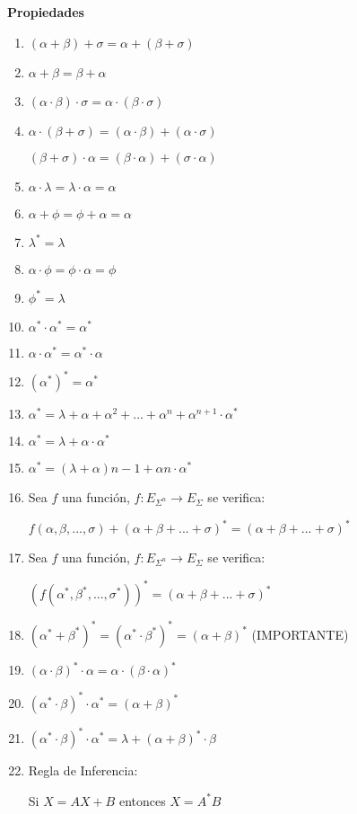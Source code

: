 \documentclass[12pt, twoside, openright]{report} %
\begin{document}
\textbf{Propiedades}
\begin{multicols}{2}
	\begin{enumerate}
		\item $(\alpha+\beta)+\sigma = \alpha + (\beta + \sigma)$
		\item $\alpha + \beta = \beta + \alpha$
		\item $(\alpha \cdot \beta)\cdot\sigma = \alpha \cdot (\beta\cdot\sigma)$
		\item $\alpha \cdot (\beta +\sigma) = (\alpha \cdot \beta) + (\alpha \cdot \sigma)$

		      $(\beta +\sigma) \cdot \alpha  = (\beta \cdot \alpha) + (\sigma \cdot \alpha)$
		\item $\alpha \cdot \lambda = \lambda \cdot \alpha = \alpha$
		\item $\alpha + \phi = \phi + \alpha = \alpha$
		\item $\lambda^* = \lambda$
		\item $\alpha \cdot \phi = \phi \cdot \alpha= \phi$
		\item $\phi^* = \lambda$
		\item $\alpha^* \cdot \alpha^* = \alpha^*$
		\item $\alpha \cdot \alpha^* = \alpha^* \cdot \alpha$
		      \columnbreak
		\item $(\alpha^*)^*=\alpha^*$
		\item $\alpha^* = \lambda + \alpha + \alpha^2 + ... + \alpha^n + \alpha^{n+1} \cdot \alpha^*$
		\item $\alpha^* = \lambda + \alpha \cdot \alpha^*$
		\item $\alpha^* = (\lambda + \alpha)n-1 + \alpha n \cdot \alpha^*$
		\item Sea $f$ una función, $f: E_{\Sigma^n} \rightarrow E_\Sigma$ se verifica:

		      $f(\alpha, \beta, ..., \sigma) + (\alpha + \beta + ... + \sigma)^* = (\alpha + \beta + ... + \sigma)^*$
		\item Sea $f$ una función, $f: E_{\Sigma^n} \rightarrow E_\Sigma$ se verifica:

		      $(f(\alpha^*, \beta^*, ..., \sigma^*))^* = (\alpha + \beta + ... + \sigma)^*$
		\item $(\alpha^* + \beta^*)^* = (\alpha^* \cdot \beta^*)^* = (\alpha + \beta)^*$ (IMPORTANTE)
		\item $(\alpha \cdot \beta)^*\cdot \alpha = \alpha \cdot (\beta \cdot \alpha)^*$
		\item $(\alpha^* \cdot \beta)^*\cdot \alpha^* =(\alpha + \beta)^*$
		\item $(\alpha^* \cdot \beta)^*\cdot \alpha^* = \lambda + (\alpha + \beta)^*\cdot \beta$
		\item Regla de Inferencia:

		      Si $X=AX+B$ entonces $X=A^*B$
	\end{enumerate}
\end{multicols}
\end{document}
